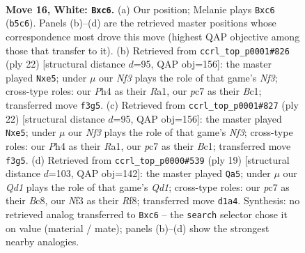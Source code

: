 \documentclass[11pt]{article}
\begin{document}
\clearpage

\begin{figure}[p]\centering
\begin{subfigure}{0.46\textwidth}\centering
\resizebox{\linewidth}{!}{%
\newchessgame
\chessboard[
  setfen={r1b2rk1/2p2p2/2n3p1/pBb1p2p/2P3nP/3q1N2/PP1N1PP1/R1BQR1K1 w - - 1 16},
  showmover=false,
  pgfstyle=straightmove, color=movearrow, markmove={b5-c6}
]}
\caption{}
\end{subfigure}\hfill
\begin{subfigure}{0.46\textwidth}\centering
\resizebox{\linewidth}{!}{%
\newchessgame
\chessboard[
  setfen={r4rk1/ppp1bppp/1nn5/4p2b/8/1BPq1N1P/PP1N1PP1/R1BQR1K1 w - - 0 12},
  showmover=false,
  pgfstyle=straightmove, color=movearrow, markmove={f3-e5}
]}
\caption{}
\end{subfigure}
\\[4pt]
\begin{subfigure}{0.46\textwidth}\centering
\resizebox{\linewidth}{!}{%
\newchessgame
\chessboard[
  setfen={r4rk1/ppp1bppp/1nn5/4p2b/8/1BPq1N1P/PP1N1PP1/R1BQR1K1 w - - 0 12},
  showmover=false,
  pgfstyle=straightmove, color=movearrow, markmove={f3-e5}
]}
\caption{}
\end{subfigure}\hfill
\begin{subfigure}{0.46\textwidth}\centering
\resizebox{\linewidth}{!}{%
\newchessgame
\chessboard[
  setfen={r1bq1rk1/pp1n1pbp/2pQ1np1/4p3/P3P3/2N1BN1P/1PP2PP1/R3KB1R b KQ - 1 10},
  showmover=false,
  pgfstyle=straightmove, color=movearrow, markmove={d8-a5}
]}
\caption{}
\end{subfigure}
\caption{\textbf{Move 16, White: \texttt{Bxc6}.} (a) Our position; Melanie plays \texttt{Bxc6} (\texttt{b5c6}). Panels (b)--(d) are the retrieved master positions whose correspondence most drove this move (highest QAP objective among those that transfer to it). (b) Retrieved from \texttt{ccrl\_top\_p0001\#826} (ply 22) [structural distance $d$=95, QAP obj=156]: the master played \texttt{Nxe5}; under $\mu$ our \emph{Nf3} plays the role of that game's \emph{Nf3}; cross-type roles: our \emph{P}h4 as their \emph{R}a1, our \emph{p}c7 as their \emph{B}c1; transferred move \texttt{f3g5}. (c) Retrieved from \texttt{ccrl\_top\_p0001\#827} (ply 22) [structural distance $d$=95, QAP obj=156]: the master played \texttt{Nxe5}; under $\mu$ our \emph{Nf3} plays the role of that game's \emph{Nf3}; cross-type roles: our \emph{P}h4 as their \emph{R}a1, our \emph{p}c7 as their \emph{B}c1; transferred move \texttt{f3g5}. (d) Retrieved from \texttt{ccrl\_top\_p0000\#539} (ply 19) [structural distance $d$=103, QAP obj=142]: the master played \texttt{Qa5}; under $\mu$ our \emph{Qd1} plays the role of that game's \emph{Qd1}; cross-type roles: our \emph{p}c7 as their \emph{B}c8, our \emph{N}f3 as their \emph{R}f8; transferred move \texttt{d1a4}. Synthesis: no retrieved analog transferred to \texttt{Bxc6} -- the \texttt{search} selector chose it on value (material / mate); panels (b)--(d) show the strongest nearby analogies.}
\label{fig:thought-m30}
\end{figure}
\end{document}
